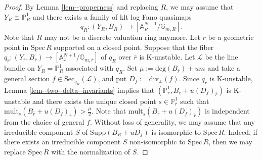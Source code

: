 \documentclass[12pt,twoside]{amsart}
\theoremstyle{definition}
\begin{document}
\begin{proof}
    By Lemma \ref{lem--properness} and replacing $R$, we may assume that $Y_R\cong\mathbb{P}^1_{R}$ and there exists a family of klt log Fano quasimaps 
    \[
    q_R\colon (Y_R,B_R)\to [\mathbb{A}^{N+1}_{R}/\mathbb{G}_{m,R}].
    \]
    Note that $R$ may not be a discrete valuation ring anymore.
    Let $\bar{r}$ be a geometric point in $\mathrm{Spec}\,R$ supported on a closed point. 
     Suppose that the fiber $q_{\bar{r}}\colon (Y_{\bar{r}},B_{\bar{r}})\to [\mathbb{A}^{N+1}_{\bar{r}}/\mathbb{G}_{m,{\bar{r}}}]$ of $q_R$ over $\bar{r}$ is K-unstable. 
    Let $\mathscr{L}$ be the line bundle on $Y_R=\mathbb{P}^1_{R}$ associated with $q_{R}$.
    Set $\mu:=\mathrm{deg}(B_{{\bar{r}}})+um$ and take a general section $f\in \mathrm{Sec}_{q_{R}}(\mathscr{L})$, and put $D_f:=\mathrm{div}_{\mathscr{L}}(f)$.
    Since $q_{\bar{r}}$ is K-unstable, Lemma \ref{lem--two--delta--invariants} implies that $(\mathbb{P}^1_{\bar{r}},B_{{\bar{r}}}+u(D_f)_{\bar{r}})$ is K-unstable and there exists the unique closed point $s\in \mathbb{P}^1_{\bar{r}}$ such that $\mathrm{mult}_s(B_{{\bar{r}}}+u(D_f)_{\bar{r}})>\frac{\mu}{2}$.
Note that $\mathrm{mult}_s(B_{{\bar{r}}}+u(D_f)_{\bar{r}})$ is independent from the choice of general $f$.
    Without loss of generality, we may assume that any irreducible component $S$ of $\mathrm{Supp}(B_R+uD_f)$ is isomorphic to $\mathrm{Spec}\, R$. Indeed, if there exists an irreducible component $S$ non-isomorphic to $\mathrm{Spec}\, R$, then we may replace $\mathrm{Spec}\, R$ with the normalization of $S$.
  
    


\end{proof}
\end{document}
